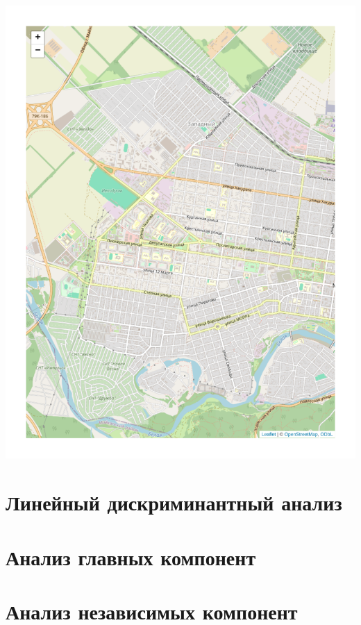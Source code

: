 \documentclass[
  letterpaper,
  DIV=11,
  numbers=noendperiod]{scrreprt}
\theoremstyle{definition}
\theoremstyle{remark}
\begin{document}
\includegraphics{andan-cluster_files/figure-pdf/maikop-1.pdf}


\chapter{Линейный дискриминантный анализ}\label{andan-lda}


\chapter{Анализ главных компонент}\label{andan-pca}


\chapter{Анализ независимых компонент}\label{andan-ica}
\end{document}
